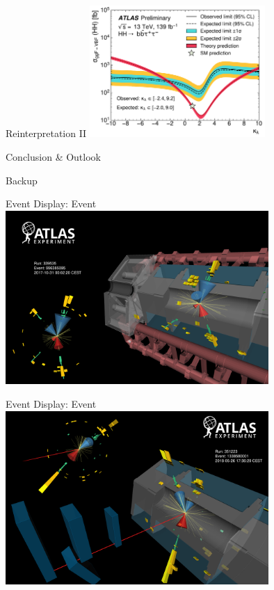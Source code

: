 \documentclass[11pt, xcolor={dvipsnames}, aspectratio=169]{beamer}
\begin{document}
\begin{frame}{Reinterpretation II}
  \includegraphics[width=0.5\textwidth]{self_coupling/klam_scan_result}
\end{frame}


\begin{frame}{Conclusion \& Outlook}
\end{frame}


\begin{frame}[standout]
  Backup
\end{frame}


\begin{frame}{Event Display: \hadhad Event}
  \centering
  \includegraphics[width=0.75\textwidth]{event_displays/hadhad}
\end{frame}


\begin{frame}{Event Display: \lephad Event}
  \centering
  \includegraphics[width=0.75\textwidth]{event_displays/lephad}
\end{frame}

\end{document}
